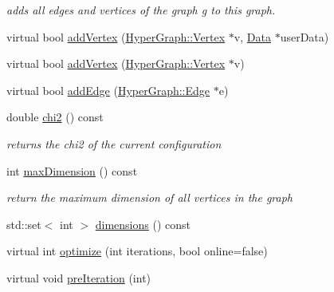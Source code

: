 \begin{DoxyCompactItemize}
\begin{DoxyCompactList}\small\item\em adds all edges and vertices of the graph {\itshape g} to this graph. \end{DoxyCompactList}\item 
virtual bool \hyperlink{structg2o_1_1OptimizableGraph_ae0b93774ce1dfa0dfd501c86ad4f773e}{add\-Vertex} (\hyperlink{classg2o_1_1HyperGraph_1_1Vertex}{Hyper\-Graph\-::\-Vertex} $\ast$v, \hyperlink{classg2o_1_1OptimizableGraph_1_1Data}{Data} $\ast$user\-Data)
\item 
virtual bool \hyperlink{structg2o_1_1OptimizableGraph_ac6f41f49fe6148fbe17133d10bf29b4c}{add\-Vertex} (\hyperlink{classg2o_1_1HyperGraph_1_1Vertex}{Hyper\-Graph\-::\-Vertex} $\ast$v)
\item 
virtual bool \hyperlink{structg2o_1_1OptimizableGraph_a6831ed69fce3dba691f53302a2813070}{add\-Edge} (\hyperlink{classg2o_1_1HyperGraph_1_1Edge}{Hyper\-Graph\-::\-Edge} $\ast$e)
\item 
\hypertarget{structg2o_1_1OptimizableGraph_afa9378225b271351f4425bd266f76d3a}{double \hyperlink{structg2o_1_1OptimizableGraph_afa9378225b271351f4425bd266f76d3a}{chi2} () const }\label{structg2o_1_1OptimizableGraph_afa9378225b271351f4425bd266f76d3a}

\begin{DoxyCompactList}\small\item\em returns the chi2 of the current configuration \end{DoxyCompactList}\item 
\hypertarget{structg2o_1_1OptimizableGraph_abb25500d3f73dae8f2325ae11991c46f}{int \hyperlink{structg2o_1_1OptimizableGraph_abb25500d3f73dae8f2325ae11991c46f}{max\-Dimension} () const }\label{structg2o_1_1OptimizableGraph_abb25500d3f73dae8f2325ae11991c46f}

\begin{DoxyCompactList}\small\item\em return the maximum dimension of all vertices in the graph \end{DoxyCompactList}\item 
std\-::set$<$ int $>$ \hyperlink{structg2o_1_1OptimizableGraph_a186d6d06a59395488cd15d25bf112ad9}{dimensions} () const 
\item 
virtual int \hyperlink{structg2o_1_1OptimizableGraph_ac1b2e36c05680dd3e60ed6f90dddf5d8}{optimize} (int iterations, bool online=false)
\item 
\hypertarget{structg2o_1_1OptimizableGraph_ad295e7f06651db627b8ebde3d8898bab}{virtual void \hyperlink{structg2o_1_1OptimizableGraph_ad295e7f06651db627b8ebde3d8898bab}{pre\-Iteration} (int)}\label{structg2o_1_1OptimizableGraph_ad295e7f06651db627b8ebde3d8898bab}


\end{DoxyCompactItemize}
